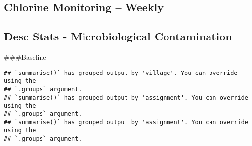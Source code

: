 \documentclass[
]{article}
\begin{document}
\hypertarget{chlorine-monitoring-weekly}{%
\subsection{Chlorine Monitoring --
Weekly}\label{chlorine-monitoring-weekly}}

\hypertarget{desc-stats---microbiological-contamination}{%
\subsection{Desc Stats - Microbiological
Contamination}\label{desc-stats---microbiological-contamination}}

\#\#\#Baseline

\begin{verbatim}
## `summarise()` has grouped output by 'village'. You can override using the
## `.groups` argument.
## `summarise()` has grouped output by 'assignment'. You can override using the
## `.groups` argument.
## `summarise()` has grouped output by 'assignment'. You can override using the
## `.groups` argument.
\end{verbatim}
\end{document}
